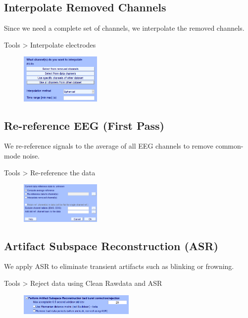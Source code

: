 \documentclass[hidelinks,12pt]{article}
\begin{document}
	\newpage
	
	\subsection{Interpolate Removed Channels}
		Since we need a complete set of channels, we interpolate the removed channels.
		
		Tools > Interpolate electrodes
		
		\begin{figure}[h!]
			\centering
			\includegraphics[width=0.35\textwidth]{11}
		\end{figure}
		
		
		
	\subsection{Re-reference EEG (First Pass)}
		We re-reference signals to the average of all EEG channels to remove common-mode noise.
		
		Tools > Re-reference the data
		
		\begin{figure}[h!]
			\centering
			\includegraphics[width=0.35\textwidth]{12}
		\end{figure}
	
	\subsection{Artifact Subspace Reconstruction (ASR)}
		We apply ASR to eliminate transient artifacts such as blinking or frowning.
		
		Tools > Reject data using Clean Rawdata and ASR
		
		\begin{figure}[h!]
			\centering
			\includegraphics[width=0.5\textwidth]{16}
		\end{figure}
		
\end{document}
